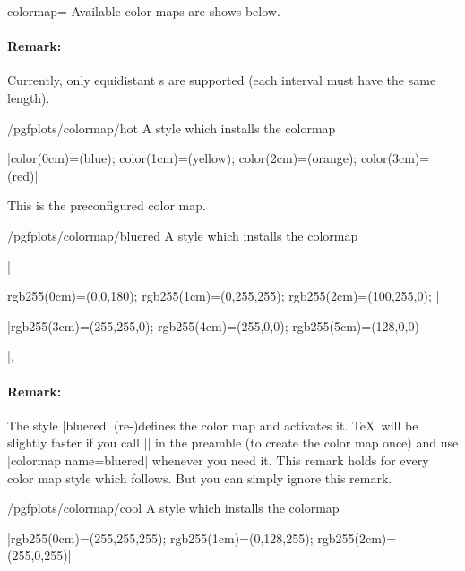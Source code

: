 \begin{pgfplotskey}{colormap=}
Available color maps are shows below.

\paragraph{Remark:} Currently, only equidistant s are supported (each interval must have the same length).
\end{pgfplotskey}

\begin{stylekey}{/pgfplots/colormap/hot}
	A style which installs the colormap

	|{color(0cm)=(blue); color(1cm)=(yellow); color(2cm)=(orange); color(3cm)=(red)}|


	This is the preconfigured color map.
\end{stylekey}

\begin{stylekey}{/pgfplots/colormap/bluered}
	A style which installs the colormap

	|{rgb255(0cm)=(0,0,180); rgb255(1cm)=(0,255,255); rgb255(2cm)=(100,255,0); |

	|rgb255(3cm)=(255,255,0); rgb255(4cm)=(255,0,0); rgb255(5cm)=(128,0,0)}|,


\begin{codeexample}[]
\end{codeexample}

	\paragraph{Remark:} 
	The style |bluered| (re-)defines the color map and activates it. \TeX\ will be slightly faster if you call |\pgfplotsset{colormap/bluered}| in the preamble (to create the color map once) and use |colormap name=bluered| whenever you need it. This remark holds for every color map style which follows. But you can simply ignore this remark.
\end{stylekey}

\begin{stylekey}{/pgfplots/colormap/cool}
	A style which installs the colormap

	|{rgb255(0cm)=(255,255,255); rgb255(1cm)=(0,128,255); rgb255(2cm)=(255,0,255)}|

\end{stylekey}

